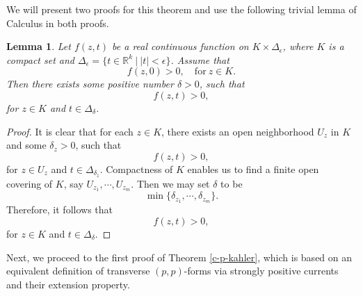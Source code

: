 \documentclass[12pt]{amsart}
\numberwithin{equation}{section}
\newtheorem{lemma}  [theorem]     {Lemma}
\renewcommand{\1}{\mathds{1}}
\renewcommand{\>}{\rightarrow}
\begin{document}
We will present two proofs for this theorem and use the following trivial lemma of Calculus in both proofs.
\begin{lemma}\label{interval}
Let $f(z,t)$ be a real continuous function on $K \times \Delta_{\epsilon}$, where $K$ is a compact set and
$\Delta_{\epsilon}=\{t \in \mathbb{R}^k\ \big |\ |t|<\epsilon \}$. Assume that
\[ f(z,0)>0, \quad \text{for}\ z \in K.\]
Then there exists some positive number $\delta>0$, such that
\[ f(z,t)>0,\]
for $z \in K$ and $t\in \Delta_\delta$.
\end{lemma}

\begin{proof}
It is clear that for each $z \in K$, there exists an open neighborhood $U_z$ in $K$ and some $\delta_{z}>0$, such that
\[ f(z,t)>0, \]
for $z \in U_z$ and $t \in \Delta_{\delta_z}$. Compactness of $K$ enables us to find
a finite open covering of $K$, say $U_{z_1}, \cdots, U_{z_m}$. Then we may set $\delta$ to be
\[ \min\{ \delta_{z_1},\cdots,\delta_{z_m} \}. \]
Therefore, it follows that
\[ f(z,t) >0 ,\]
for $z \in K$ and $t\in \Delta_\delta$.
\end{proof}

%



Next, we proceed to the first proof of Theorem \ref{c-p-kahler}, which is based on an equivalent definition of transverse $(p,p)$-forms via strongly positive currents and
their extension property.
\end{document}
